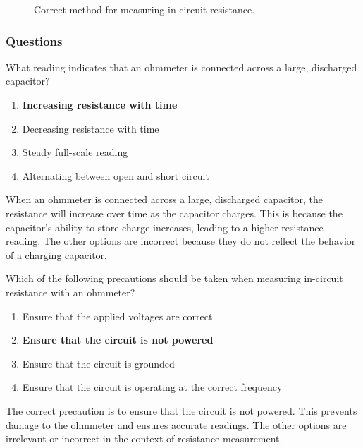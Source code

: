 \begin{figure}[h]
\centering
\caption{Correct method for measuring in-circuit resistance.}
\label{fig:ohmmeter-circuit}
\end{figure}

\subsubsection{Questions}

\begin{tcolorbox}[colback=gray!10!white,colframe=black!75!black,title={T7D10}]
What reading indicates that an ohmmeter is connected across a large, discharged capacitor?
\begin{enumerate}[label=\Alph*),noitemsep]
    \item \textbf{Increasing resistance with time}
    \item Decreasing resistance with time
    \item Steady full-scale reading
    \item Alternating between open and short circuit
\end{enumerate}
\end{tcolorbox}

When an ohmmeter is connected across a large, discharged capacitor, the resistance will increase over time as the capacitor charges. This is because the capacitor's ability to store charge increases, leading to a higher resistance reading. The other options are incorrect because they do not reflect the behavior of a charging capacitor.

\begin{tcolorbox}[colback=gray!10!white,colframe=black!75!black,title={T7D11}]
Which of the following precautions should be taken when measuring in-circuit resistance with an ohmmeter?
\begin{enumerate}[label=\Alph*),noitemsep]
    \item Ensure that the applied voltages are correct
    \item \textbf{Ensure that the circuit is not powered}
    \item Ensure that the circuit is grounded
    \item Ensure that the circuit is operating at the correct frequency
\end{enumerate}
\end{tcolorbox}

The correct precaution is to ensure that the circuit is not powered. This prevents damage to the ohmmeter and ensures accurate readings. The other options are irrelevant or incorrect in the context of resistance measurement.
